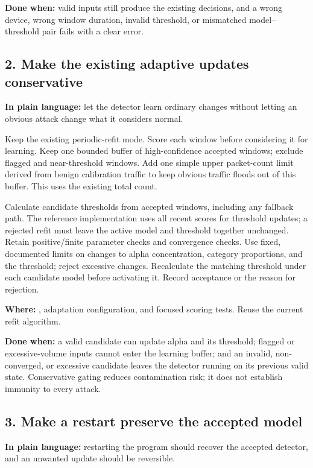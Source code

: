 \documentclass[11pt,a4paper]{article}
\begin{document}
\textbf{Done when:} valid inputs still produce the existing decisions, and a
wrong device, wrong window duration, invalid threshold, or mismatched
model--threshold pair fails with a clear error.

\subsection{2. Make the existing adaptive updates conservative}

\textbf{In plain language:} let the detector learn ordinary changes without
letting an obvious attack change what it considers normal.

Keep the existing periodic-refit mode. Score each window before considering it
for learning. Keep one bounded buffer of high-confidence accepted windows;
exclude flagged and near-threshold windows. Add one simple upper packet-count
limit derived from benign calibration traffic to keep obvious traffic floods
out of this buffer. This uses the existing total count.

Calculate candidate thresholds from accepted windows, including any fallback
path. The reference implementation uses all recent scores for threshold updates;
a rejected refit must leave the active model and threshold together unchanged.
Retain positive/finite parameter checks and convergence checks. Use fixed,
documented limits on changes to alpha concentration, category proportions, and
the threshold; reject excessive changes. Recalculate the matching threshold
under each candidate model before activating it. Record acceptance or the reason
for rejection.

\textbf{Where:} , adaptation
configuration, and focused scoring tests. Reuse the current refit algorithm.

\textbf{Done when:} a valid candidate can update alpha and its threshold;
flagged or excessive-volume inputs cannot enter the learning buffer; and an
invalid, non-converged, or excessive candidate leaves the detector running on
its previous valid state. Conservative gating reduces contamination risk; it
does not establish immunity to every attack.

\subsection{3. Make a restart preserve the accepted model}

\textbf{In plain language:} restarting the program should recover the accepted
detector, and an unwanted update should be reversible.
\end{document}
